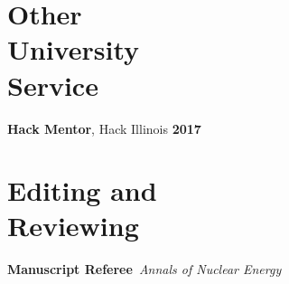 \documentclass[margin,line]{resume}
\begin{document}
\begin{resume}
    \section{\mysidestyle Other\\University\\Service}
		\textbf{Hack Mentor}, Hack Illinois \hfill \textbf{2017}\vspace{.5mm}\\%

\section{\mysidestyle Editing and\\Reviewing}
    \textbf{Manuscript Referee}~\hfill\emph{Annals of Nuclear Energy}\\%


\end{resume}
\end{document}
